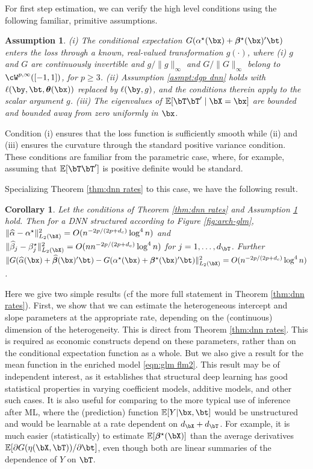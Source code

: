 \documentclass[12pt]{article}
\newtheorem{corollary}{Corollary}
\newtheorem{assumption}{Assumption}
\numberwithin{equation}{section}
\theoremstyle{definition}
\newcommand{\E}{\mathbb{E}}
\newcommand{\btheta}{\boldsymbol{\theta}}
\newcommand{\bbeta}{\boldsymbol{\beta}}
\newcommand{\atrue}{\alpha^\star}
\newcommand{\btrue}{\beta^\star}
\newcommand{\bbtrue}{\bbeta^\star}
\newcommand{\ahat}{\widehat{\alpha}}
\newcommand{\bhat}{\widehat{\beta}}
\newcommand{\bbhat}{\widehat{\bbeta}}
\newcommand{\dx}{d_{\bX}}  %
\newcommand{\dc}{d_c}  %
\newcommand{\dt}{d_{\bT}}  %
\begin{document}
\begin{appendices}
For first step estimation, we can verify the high level conditions using the following familiar, primitive assumptions. 
\begin{assumption}
    \label{asmpt:glm}
    (i) The conditional expectation $G(\atrue(\bx) + \bbtrue(\bx)'\bt )$ enters the loss through a known, real-valued transformation $g(\cdot)$, where (i) $g$ and $G$ are continuously invertible and $g/\|g\|_\infty$ and $G/\|G\|_\infty$ belong to $\cW^{p, \infty}([-1, 1])$, for $p\geq 3$. (ii) Assumption \ref{asmpt:dgp dnn} holds with $\ell(\by,\bt,\btheta(\bx) )$ replaced by $\ell(\by,g)$, and the conditions therein apply to the scalar argument $g$. (iii) The eigenvalues of $\E[\bT\bT' \mid \bX=\bx]$ are bounded and bounded away from zero uniformly in $\bx$.
\end{assumption}
Condition (i) ensures that the loss function is sufficiently smooth while (ii) and (iii) ensures the curvature through the standard positive variance condition. These conditions are familiar from the parametric case, where, for example, assuming that $\E[\bT\bT']$ is positive definite would be standard. 

Specializing Theorem \ref{thm:dnn rates} to this case, we have the following result.
\begin{corollary}
    \label{cor:glm rates}
    Let the conditions of Theorem \ref{thm:dnn rates} and Assumption \ref{asmpt:glm} hold. Then for a DNN structured according to Figure \ref{fig:arch-glm}, $\| \ahat - \atrue \|_{L_2(\bX)}^2 = O(n^{-2p/(2p+\dc)} \log^4 n)$ and $\| \bhat_j - \btrue_j \|_{L_2(\bX)}^2 = O(nn^{-2p/(2p+\dc)} \log^4 n)$ for $j=1,\ldots,\dt$. Further $\| G(\ahat(\bx) + \bbhat(\bx)'\bt) - G(\atrue(\bx) + \bbtrue(\bx)'\bt ) \|_{L_2(\bX)}^2 = O(n^{-2p/(2p+\dc)} \log^4 n)$.
\end{corollary} 
Here we give two simple results (cf the more full statement in Theorem \ref{thm:dnn rates}). First, we show that we can estimate the heterogeneous intercept and slope parameters at the appropriate rate, depending on the (continuous) dimension of the heterogeneity. This is direct from Theorem \ref{thm:dnn rates}. This is required as economic constructs depend on these parameters, rather than on the conditional expectation function as a whole. But we also give a result for the mean function in the enriched model \eqref{eqn:glm flm2}. This result may be of independent interest, as it establishes that structural deep learning has good statistical properties in varying coefficient models, additive models, and other such cases. It is also useful for comparing to the more typical use of inference after ML, where the (prediction) function $\E[Y \vert \bx, \bt]$ would be unstructured and would be learnable at a rate dependent on $\dx + \dt$. For example, it is much easier (statistically) to estimate $\E[\bbtrue(\bX)]$ than the average derivatives $\E[\partial G(\eta(\bX,\bT)) / \partial \bt]$, even though both are linear summaries of the dependence of $Y$ on $\bT$.







\end{appendices}
\end{document}
